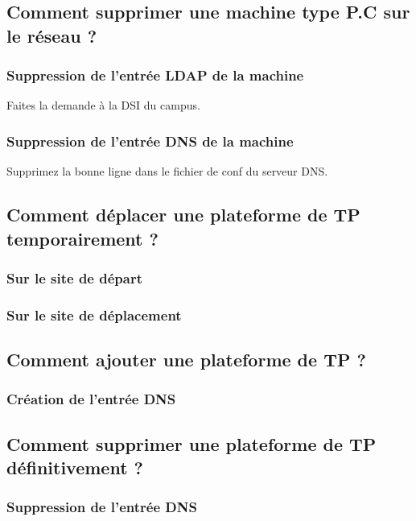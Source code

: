 \documentclass[a4paper]{article}
\begin{document}
\subsection{Comment supprimer une machine type P.C sur le réseau ?}

\subsubsection{Suppression de l'entrée LDAP de la machine}

Faites la demande à la DSI du campus.

\subsubsection{Suppression de l'entrée DNS de la machine}

Supprimez la bonne ligne dans le fichier de conf du serveur DNS.

\subsection{Comment déplacer une plateforme de TP temporairement ?}

\subsubsection{Sur le site de départ}

\subsubsection{Sur le site de déplacement}

\subsection{Comment ajouter une plateforme de TP  ?}

\subsubsection{Création de l'entrée DNS}

\subsection{Comment supprimer une plateforme de TP définitivement ?}

\subsubsection{Suppression de l'entrée DNS}
\end{document}
